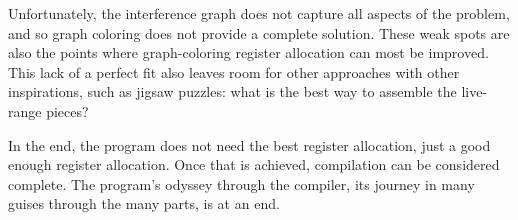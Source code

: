 Unfortunately, the interference graph does not capture all aspects of the problem, and so graph coloring does not provide a complete solution. These weak spots are also the points where graph-coloring register allocation can most be improved. This lack of a perfect fit also leaves room for other approaches with other inspirations, such as jigsaw puzzles: what is the best way to assemble the live-range pieces?

In the end, the program does not need the best register allocation, just a good enough register allocation. Once that is achieved, compilation can be considered complete. The program's odyssey through the compiler, its journey in many guises through the many parts, is at an end.